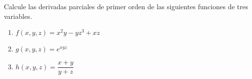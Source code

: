 Calcule las derivadas parciales de primer orden de las siguientes funciones de tres variables.
\begin{enumerate}
    \item $f(x, y, z) = x^2 y - yz^3 + xz$
    \item $g(x, y, z) = e^{xyz}$
    \item $h(x, y, z) = \dfrac{x + y}{y + z}$
\end{enumerate}

